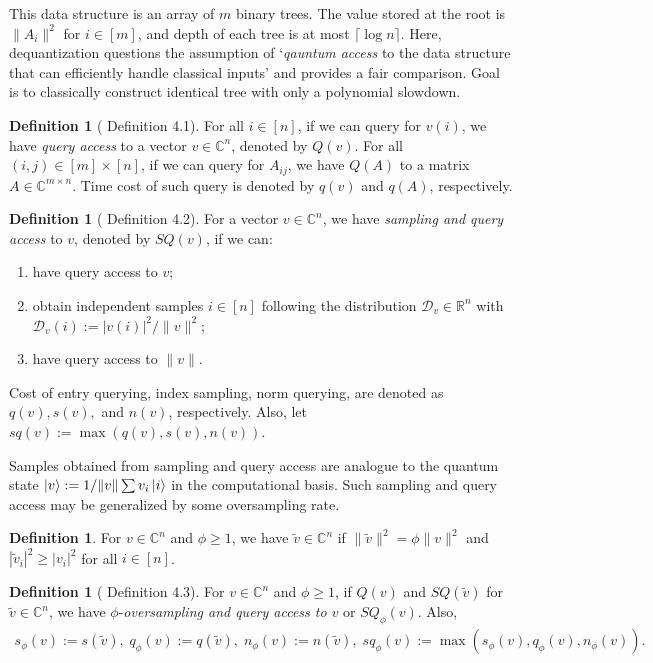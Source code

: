 \documentclass[10pt,twoside,reqno]{amsart} %
\theoremstyle{plain}
\theoremstyle{definition}
\newtheorem{defn}[thm]{Definition}
\begin{document}
This data structure is an array of $m$  binary trees. The value
stored at the root is $\|A_i\|^2$ for $i\in[m]$, and depth of each tree is
at most $\lceil\log n\rceil$. Here, dequantization questions the assumption
of `\emph{qauntum access} to the data structure that can efficiently handle
classical inputs' and provides a fair comparison. Goal is to classically
construct identical tree with only a polynomial slowdown. 
\begin{defn}[\cite{tang2023} Definition 4.1]
  For all $i\in[n]$, if we can query for $v(i)$, we have \emph{query access}
  to a vector $v\in\mathbb{C}^n$, denoted by $Q(v)$. For all 
  $(i,j)\in[m]\times[n]$, if we can query for $A_{ij}$, we have $Q(A)$ to
  a matrix $A\in\mathbb{C}^{m\times n}$. Time cost of such query is denoted
  by $q(v)$ and $q(A)$, respectively.
\end{defn}
\begin{defn}[\cite{tang2023} Definition 4.2]
  For a vector $v\in\mathbb{C}^n$, we have \emph{sampling and query access} to
  $v$, denoted by $SQ(v)$, if we can:
  \begin{enumerate}
    \item have query access to $v$;
    \item obtain independent samples $i\in[n]$ following the distribution
      $\mathcal{D}_v\in\mathbb{R}^n$ with $\mathcal{D}_v(i):=|v(i)|^2/\|v\|^2$;
    \item have query access to $\|v\|$.
  \end{enumerate}
  Cost of entry querying, index sampling, norm querying, are denoted as
  $q(v),s(v),$ and $n(v)$, respectively. Also, let $sq(v):=\max(q(v),s(v),n(v))$.
\end{defn}
Samples obtained from sampling and query access are analogue to the quantum
state $\ket{v} := 1/\|v\|\sum v_i\ket{i}$ in the computational basis. Such
sampling and query access may be generalized by some oversampling rate.
\begin{defn}
  For $v\in\mathbb{C}^n$ and $\phi\geq1$, we have
  $\widetilde{v}\in\mathbb{C}^n$ if $\|\widetilde{v}\|^2=\phi\|v\|^2$ and
  $|\widetilde{v}_i|^2\geq |v_i|^2$ for all $i\in[n]$.
\end{defn}
\begin{defn}[\cite{tang2023} Definition 4.3]
  For $v\in\mathbb{C}^n$ and $\phi\geq1$, if $Q(v)$ and 
  $SQ(\widetilde{v})$ for $\widetilde{v}\in\mathbb{C}^n$, we have 
  $\phi$-\emph{oversampling and query access to $v$} or $SQ_{\phi}(v)$. Also,
  \begin{align*}
    s_{\phi}(v) := s(\widetilde{v}),\;
    q_{\phi}(v) := q(\widetilde{v}),\;
    n_{\phi}(v) := n(\widetilde{v}),\;
    sq_{\phi}(v) := \max(s_{\phi}(v),q_{\phi}(v),n_{\phi}(v)).
  \end{align*}
\end{defn}
\end{document}
